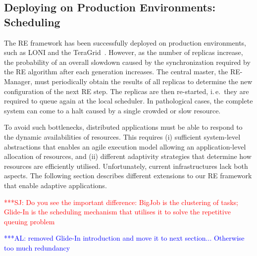 \documentclass{rspublic}
\newcommand{\alnote}[1]{ {\textcolor{blue} { ***AL: #1 }}}
\newcommand{\jhanote}[1]{ {\textcolor{red} { ***SJ: #1 }}}
\newcommand{\alnote}[1]{}
\newcommand{\jhanote}[1]{}
\begin{document}
\subsection{Deploying on Production Environments: Scheduling}

The RE framework has been successfully deployed on
production environments, such as LONI and the 
TeraGrid~\citep{Luckow:2008la}. However, as the
number of replicas increase, the probability of an overall slowdown
caused by the synchronization required by the RE
algorithm after each generation increases.  The central master, the
RE-Manager, must periodically obtain the results of all replicas to
determine the new configuration of the next RE step. The replicas are
then re-started, i.\,e.\ they are required to queue again at the local
scheduler. In pathological cases, the complete system can come to a
halt caused by a single crowded or slow resource.  
                        
To avoid such bottlenecks, distributed applications must be able to 
respond to the dynamic availabilities of resources. This requires 
(i) sufficient system-level abstractions that enables an agile
execution model allowing an application-level allocation of resources, 
and (ii) different adaptivity strategies that determine how
resources are efficiently utilised. Unfortunately, current 
infrastructures lack both aspects. The following section 
describes different extensions to our RE framework that 
enable adaptive applications.



\jhanote{Do you see the important difference: BigJob is the clustering
  of tasks; Glide-In is the scheduling mechanism that utilises it to
  solve the repetitive queuing problem}

\alnote{removed Glide-In introduction and move it to next
  section... Otherwise too much redundancy}


\end{document}
